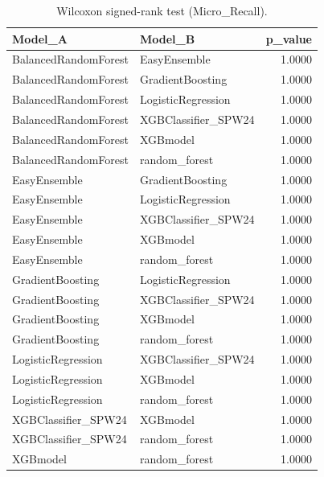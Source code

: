 \begin{table}[t]
\centering
\begin{tabular}{llr}
\toprule
Model_A & Model_B & p_value \\
\midrule
BalancedRandomForest & EasyEnsemble & 1.0000 \\
BalancedRandomForest & GradientBoosting & 1.0000 \\
BalancedRandomForest & LogisticRegression & 1.0000 \\
BalancedRandomForest & XGBClassifier_SPW24 & 1.0000 \\
BalancedRandomForest & XGBmodel & 1.0000 \\
BalancedRandomForest & random_forest & 1.0000 \\
EasyEnsemble & GradientBoosting & 1.0000 \\
EasyEnsemble & LogisticRegression & 1.0000 \\
EasyEnsemble & XGBClassifier_SPW24 & 1.0000 \\
EasyEnsemble & XGBmodel & 1.0000 \\
EasyEnsemble & random_forest & 1.0000 \\
GradientBoosting & LogisticRegression & 1.0000 \\
GradientBoosting & XGBClassifier_SPW24 & 1.0000 \\
GradientBoosting & XGBmodel & 1.0000 \\
GradientBoosting & random_forest & 1.0000 \\
LogisticRegression & XGBClassifier_SPW24 & 1.0000 \\
LogisticRegression & XGBmodel & 1.0000 \\
LogisticRegression & random_forest & 1.0000 \\
XGBClassifier_SPW24 & XGBmodel & 1.0000 \\
XGBClassifier_SPW24 & random_forest & 1.0000 \\
XGBmodel & random_forest & 1.0000 \\
\bottomrule
\end{tabular}
\caption{Wilcoxon signed-rank test (Micro_Recall).}
\label{tab:wilcoxon_Micro_Recall}
\end{table}